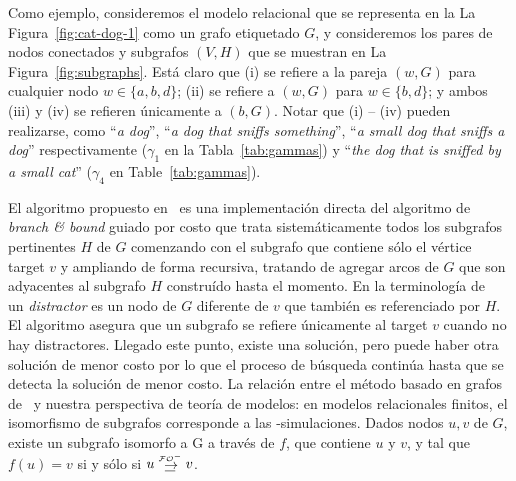 Como ejemplo, consideremos el modelo relacional que se representa en la
La Figura~\ref{fig:cat-dog-1} como un grafo etiquetado $G$, y consideremos los pares de nodos conectados y subgrafos $(V, H)$ que se muestran en 
La Figura~\ref{fig:subgraphs}. Est\'a claro que (i) se refiere a la pareja $(w, G)$
para cualquier nodo $w\in\{a,b,d\}$; (ii) se refiere a $(w, G)$ para
$w\in\{b,d\}$; y ambos (iii) y (iv) se refieren \'unicamente a $(b, G)$. Notar
que (i) -- (iv) pueden realizarse, como  ``{\em a dog}'',
``{\em a dog that sniffs something}'', ``{\em a small dog that
sniffs a dog}'' respectivamente ($\gamma_1$ en la Tabla~\ref{tab:gammas}) y ``{\em the dog that is sniffed by a small cat}'' ($\gamma_4$ en
Table~\ref{tab:gammas}).

El algoritmo propuesto en~\cite{Krahmer2003} es una
implementaci\'on directa del algoritmo de \emph{branch \& bound} guiado por costo que trata sistem\'aticamente todos los
subgrafos pertinentes $H$ de $G$ comenzando con el subgrafo
que contiene s\'olo el v\'ertice target $v$ y ampliando de forma recursiva, tratando de
agregar arcos de $G$ que son adyacentes al subgrafo $H$ constru\'ido
hasta el momento. En la terminolog\'ia de~\cite{Krahmer2003} un {\em distractor} es un nodo de $G$ diferente de
$v$ que tambi\'en es referenciado por $H$.
El algoritmo asegura que un subgrafo se refiere \'unicamente al target $v$ cuando no hay distractores. Llegado este punto, existe una
soluci\'on, pero puede haber otra
soluci\'on de menor costo por lo que el proceso de b\'usqueda contin\'ua hasta que
se detecta la soluci\'on de menor costo. 
La relaci\'on entre el m\'etodo basado en grafos
de~\cite{Krahmer2003} y nuestra perspectiva de teor\'ia de modelos: en
modelos relacionales finitos, el isomorfismo de subgrafos corresponde a las
\EPFOL-simulaciones. Dados nodos $u,v$ de
$G$, existe un subgrafo isomorfo a G a trav\'es de $f$, que contiene $ u $ y
$v$, y tal que $f(u)=v$ si y s\'olo si $u \simul{\+\EPFOL} v$.
%
%
